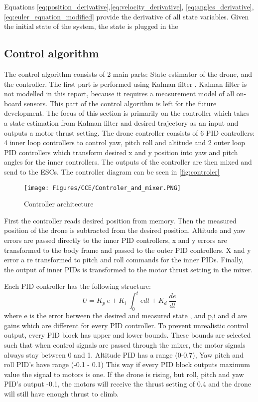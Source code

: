 Equations \ref{eq:position_derivative},\ref{eq:velocity_derivative}, \ref{eq:angles_derivative}, \ref{eq:euler_equation_modified} provide the derivative of all state variables. Given the initial state of the system, the state is plugged in the  


\subsection{Control algorithm} \label{subsec:cce_control_algorithm}
The control algorithm consists of 2 main parts: State estimator of the drone, and the controller. The first part is performed using Kalman filter \cite{kalman_filter}. Kalman filter is not modelled in this report, because it requires a measurement model of all on-board sensors. This part of the control algorithm is left for the future development. The focus of this section is primarily on the controller which takes a state estimation from Kalman filter and desired trajectory as an input and outputs a motor thrust setting.    
The drone controller consists of 6 PID controllers: 4 inner loop controllers to control yaw, pitch roll and altitude and 2 outer loop PID controllers which transform desired x and y position into yaw and pitch angles for the inner controllers. The outputs of the controller are then mixed and send to the ESCs. The controller diagram can be seen in  \autoref{fig:controler}

\begin{figure}[H]
    \centering
    \texttt{[image: Figures/CCE/Controler\_and\_mixer.PNG]}
    \caption{Controller architecture}
    \label{fig:controler}
\end{figure}

First the controller reads desired position from memory. Then the measured position of the drone is subtracted from the desired position. Altitude and yaw errors are passed directly to the inner PID controllers, x and y errors are transformed to the body frame and passed to the outer PID controllers. X and y error a re transformed to pitch and roll commands for the inner PIDs. Finally, the output of inner PIDs is transformed to the motor thrust setting in the mixer.

Each PID controller has the following structure: 
\begin{equation}
    U = K_p \: e + K_i \: \int_0^t e dt + K_d \: \frac{de}{dt} 
\end{equation}
where e is the error between the desired and measured state , and p,i and d are gains which are different for every PID controller. To prevent unrealistic control output, every PID block has upper and lower bounds. These bounds are selected such that when control signals are passed through the mixer, the motor signals always stay between 0 and 1. 
Altitude PID has a range (0-0.7), Yaw pitch and roll PID's have range (-0.1 - 0.1) This way if every PID block outputs maximum value the signal to motors is one. If the drone is rising, but roll, pitch and yaw PID's output -0.1, the motors will receive the thrust setting of 0.4 and the drone will still have enough thrust to climb. 

